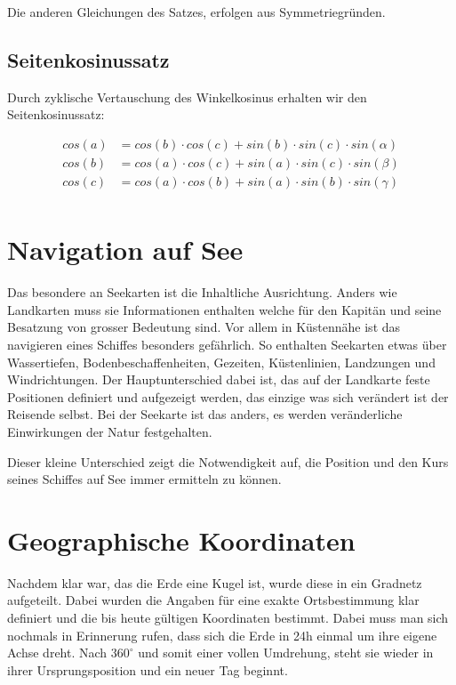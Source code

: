 \begin{refsection}
Die anderen Gleichungen des Satzes, erfolgen aus Symmetriegründen.

\subsection{Seitenkosinussatz}
Durch zyklische Vertauschung des Winkelkosinus erhalten wir den Seitenkosinussatz:

\begin{align*}
{cos(a)} &= {cos(b)} \cdot {cos(c)} + {sin(b)} \cdot {sin(c)} \cdot {sin(\alpha)}\\
{cos(b)} &= {cos(a)} \cdot {cos(c)} + {sin(a)} \cdot {sin(c)} \cdot {sin(\beta)}\\
{cos(c)} &= {cos(a)} \cdot {cos(b)} + {sin(a)} \cdot {sin(b)} \cdot {sin(\gamma)}\\
\end{align*}

\section{Navigation auf See}
Das besondere an Seekarten ist die Inhaltliche Ausrichtung. Anders wie Landkarten muss sie Informationen enthalten welche für den Kapitän und seine Besatzung von grosser Bedeutung sind. Vor allem in Küstennähe ist das navigieren eines Schiffes besonders gefährlich. So enthalten Seekarten etwas über Wassertiefen, Bodenbeschaffenheiten, Gezeiten, Küstenlinien, Landzungen und Windrichtungen.
Der Hauptunterschied dabei ist, das auf der Landkarte feste Positionen definiert und aufgezeigt werden, das einzige was sich verändert ist der Reisende selbst. Bei der Seekarte ist das anders, es werden veränderliche Einwirkungen der Natur festgehalten.

Dieser kleine Unterschied zeigt die Notwendigkeit auf, die Position und den Kurs seines Schiffes auf See immer ermitteln zu können.


\section{Geographische Koordinaten}

Nachdem klar war, das die Erde eine Kugel ist, wurde diese in ein Gradnetz aufgeteilt. Dabei wurden die Angaben für eine exakte Ortsbestimmung klar definiert und die bis heute gültigen Koordinaten bestimmt.
Dabei muss man sich nochmals in Erinnerung rufen, dass sich die Erde in 24h einmal um ihre eigene Achse dreht. Nach $360 ^{\circ}$ 
und somit einer vollen Umdrehung, steht sie wieder in ihrer Ursprungsposition und ein neuer Tag beginnt.


\end{refsection}
